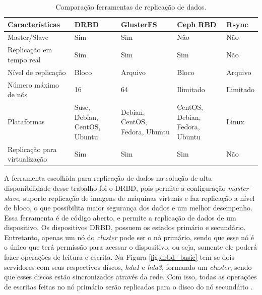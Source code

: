 \begin{table}[h!]
\caption{Comparação ferramentas de replicação de dados.}
\label{tab:replicacao}
\begin{center}
\begin{tabular}{|l|p{2.7cm}|p{2.7cm}|p{2.7cm}|p{2cm}|}\hline
Características & DRBD & GlusterFS & Ceph RBD & Rsync\\\hline
Master/Slave & Sim & Sim & Não & Não \\\hline
Replicação em tempo real & Sim & Sim & Sim & Não \\\hline
Nível de replicação & Bloco & Arquivo & Bloco & Arquivo \\\hline
Número máximo de nós & 16 & 64 & Ilimitado & Ilimitado \\\hline
Plataformas & Suse, Debian, CentOS, Ubuntu & Debian, CentOS, Fedora, Ubuntu & CentOS, Debian, Fedora, Ubuntu & Linux \\\hline
Replicação para virtualização & Sim & Sim & Sim & Não \\\hline
\end{tabular}
\end{center}
\end{table}





A ferramenta escolhida para replicação de dados na solução de alta disponibilidade desse trabalho foi o \ac{DRBD}, pois permite a configuração 
\textit{master-slave}, suporte replicação de imagens de máquinas virtuais e faz replicação a nível de bloco, o que possibilita maior segurança
dos dados e um melhor desempenho.
Essa ferramenta é de código aberto, e permite a replicação de dados de um dispositivo. Os dispositivos \ac{DRBD}, possuem os estados primário 
e secundário. Entretanto, apenas um nó do \textit{cluster} pode ser o nó primário, sendo que esse nó é o único que terá permissão para acessar 
o dispositivo, ou seja, somente ele poderá fazer operações de leitura e escrita. Na Figura \ref{fig:drbd_basic} tem-se dois servidores com seus 
respectivos discos, \textit{hda1} e \textit{hda3}, formando um \textit{cluster}, sendo que esses discos estão sincronizados através da rede. 
Com isso, todas as operações de escritas feitas no nó primário serão replicadas para o disco do nó secundário \cite{zaminhani2008}.

